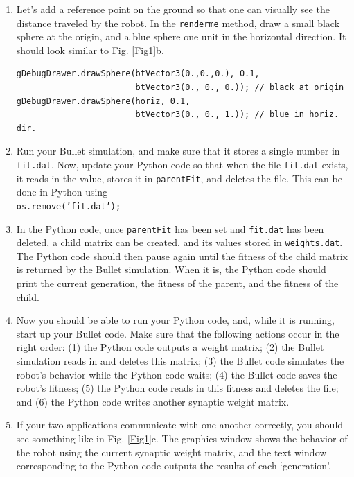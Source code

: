 \documentclass[12pt]{article}
\begin{document}
\begin{enumerate}
\item Let's add a reference point on the ground so that one can visually see the distance traveled by the robot.  In the \verb|renderme| method, draw a small black sphere at the origin, and a blue sphere one unit in the horizontal direction.  It should look similar to Fig. \ref{Fig1}b.

\begin{verbatim}
gDebugDrawer.drawSphere(btVector3(0.,0.,0.), 0.1, 
                        btVector3(0., 0., 0.)); // black at origin
gDebugDrawer.drawSphere(horiz, 0.1,    
                        btVector3(0., 0., 1.)); // blue in horiz. dir.
\end{verbatim}

\item Run your Bullet simulation, and make sure that it stores a single number in \texttt{fit.dat}. Now, update your Python code so that when the file \texttt{fit.dat} exists, it reads in the value, stores it in \texttt{parentFit}, and deletes the file. This can be done in Python using \\
\texttt{os.remove('fit.dat');}

\item In the Python code, once \texttt{parentFit} has been set and \texttt{fit.dat} has been deleted, a child matrix can be created, and its values stored in \texttt{weights.dat}. The Python code should then pause again until the fitness of the child matrix is returned by the Bullet simulation. When it is, the Python code should print the current generation, the fitness of the parent, and the fitness of the child.

\item Now you should be able to run your Python code, and, while it is running, start up your Bullet code. Make sure that the following actions occur in the right order: (1) the Python code outputs a weight matrix; (2) the Bullet simulation reads in and deletes this matrix; (3) the Bullet code simulates the robot's behavior while the Python code waits; (4) the Bullet code saves the robot's fitness; (5) the Python code reads in this fitness and deletes the file; and (6) the Python code writes another synaptic weight matrix.

\item If your two applications communicate with one another correctly, you should see something like in Fig. \ref{Fig1}c. The graphics window shows the behavior of the robot using the current synaptic weight matrix, and the text window corresponding to the Python code outputs the results of each `generation'.


\end{enumerate}
\end{document}
